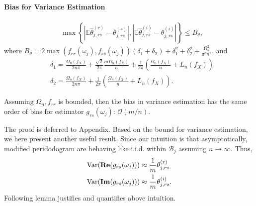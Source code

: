 \paragraph{Bias for Variance Estimation}
\begin{lem}
\label{lemma:theta_bias}
\begin{equation}
\begin{aligned}
&\max\left\{\left|\mathbb{E} \hat{\theta}^{(r)}_{j,rs} - \theta^{(r)}_{j, rs}\right|,  \left|\mathbb{E} \hat{\theta}^{(i)}_{j,rs} - \theta^{(i)}_{j, rs}\right|\right\}\le B_\theta,
\end{aligned}
\end{equation}
where $B_\theta = 2\max (f_{rr}(\omega_j),f_{ss}(\omega_j))(\delta_1+\delta_2)+\delta_1^2+\delta_2^2+\frac{\Omega_n^2}{\pi^2n^2}$,
and 
\begin{equation}
\label{eq:def_delta12}
\begin{aligned}
&\delta_1 = \frac{\Omega_n(f_X)}{2n\pi}+\frac{\sqrt{2}}{2\pi}\frac{m\Omega_n(f_X)}{n}+ \frac{1}{2\pi}\left(\frac{\Omega_n(f_X)}{n} + L_n(f_X)\right) \\
&\delta_2=\frac{\Omega_n(f_X)}{2n\pi}+ \frac{1}{2\pi}\left(\frac{\Omega_n(f_X)}{n} + L_n(f_X)\right).
\end{aligned}
\end{equation}
\end{lem}
\begin{remark}
Assuming $\Omega_n,  f_{rr}$ is bounded, then the bias in variance estimation has the same order of bias for estimator $g_{rs}(\omega_j)$: $\mathcal{O}(m/n)$. 
\end{remark}
The proof is deferred to Appendix. 
Based on the bound for variance estimation, we here present another useful result. Since our intuition is that asymptotically, modified peridodogram are behaving like i.i.d. within $\mathcal{B}_j$ assuming $n\rightarrow \infty$. Thus,  
\begin{equation}
\begin{aligned}
& \mathrm{Var}({\bf Re}(g_{rs}(\omega_j))) \approx \frac{1}{m} \theta^{(r)}_{j, rs}\\ 
& \mathrm{Var}({\bf Im}(g_{rs}(\omega_j))) \approx \frac{1}{m} \theta^{(i)}_{j, rs}.
\end{aligned}
\end{equation}
Following lemma justifies and quantifies above intuition. 
